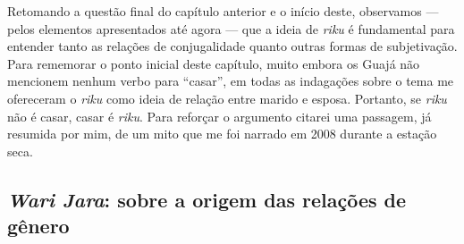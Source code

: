 Retomando a questão final do capítulo anterior e o início deste,
observamos --- pelos elementos apresentados até agora --- que a ideia de
\emph{riku} é fundamental para entender tanto as relações de
conjugalidade quanto outras formas de subjetivação. Para rememorar o
ponto inicial deste capítulo, muito embora os Guajá não mencionem nenhum
verbo para ``casar'', em todas as indagações sobre o tema me ofereceram
o \emph{riku} como ideia de relação entre marido e esposa. Portanto, se
\emph{riku} não é casar, casar é \emph{riku}. Para reforçar o argumento
citarei uma passagem, já resumida por mim, de um mito que me foi narrado
em 2008 durante a estação seca.

\subsection{\emph{Wari Jara}: sobre a origem das relações de gênero}

